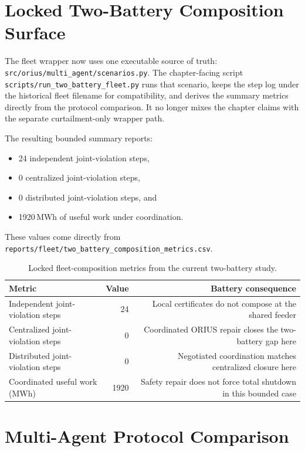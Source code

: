 \section{Locked Two-Battery Composition Surface}

The fleet wrapper now uses one executable source of truth:
\texttt{src/orius/multi\_agent/scenarios.py}.  The chapter-facing script
\texttt{scripts/run\_two\_battery\_fleet.py} runs that scenario, keeps the
step log under the historical fleet filename for compatibility, and derives
the summary metrics directly from the protocol comparison.  It no longer mixes
the chapter claims with the separate curtailment-only wrapper path.

The resulting bounded summary reports:

\begin{itemize}
  \item 24 independent joint-violation steps,
  \item 0 centralized joint-violation steps,
  \item 0 distributed joint-violation steps, and
  \item 1920\,MWh of useful work under coordination.
\end{itemize}

These values come directly from
\texttt{reports/fleet/two\_battery\_composition\_metrics.csv}.

\begin{table}[ht]
\centering
\caption{Locked fleet-composition metrics from the current two-battery study.}
\label{tab:fleet-results}
\begin{tabular}{lrr}
\toprule
\textbf{Metric} & \textbf{Value} & \textbf{Battery consequence} \\
\midrule
Independent joint-violation steps & 24 & Local certificates do not compose at the shared feeder \\
Centralized joint-violation steps & 0 & Coordinated ORIUS repair closes the two-battery gap here \\
Distributed joint-violation steps & 0 & Negotiated coordination matches centralized closure here \\
Coordinated useful work (MWh) & 1920 & Safety repair does not force total shutdown in this bounded case \\
\bottomrule
\end{tabular}
\end{table}

\section{Multi-Agent Protocol Comparison}

